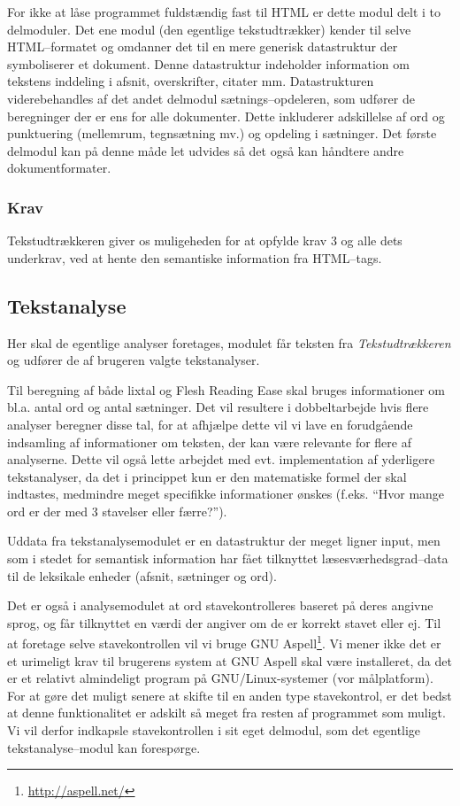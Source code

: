 \documentclass[a4paper,oneside]{memoir}
\begin{document}
For ikke at låse programmet fuldstændig fast til HTML er dette modul
delt i to delmoduler. Det ene modul (den egentlige tekstudtrækker)
kender til selve HTML--formatet og omdanner det til en mere generisk
datastruktur der symboliserer et dokument. Denne datastruktur
indeholder information om tekstens inddeling i afsnit, overskrifter,
citater mm. Datastrukturen viderebehandles af det andet delmodul
sætnings--opdeleren, som udfører de
beregninger der er ens for
alle dokumenter. Dette inkluderer adskillelse af ord og punktuering
(mellemrum, tegnsætning mv.) og opdeling i sætninger.  Det første
delmodul kan på denne måde let udvides så det også kan håndtere andre
dokumentformater.

\subsubsection{Krav}
Tekstudtrækkeren giver os muligeheden for at opfylde krav 3 og alle
dets underkrav, ved at hente den semantiske information fra
HTML--tags.

\subsection{Tekstanalyse}
\label{tekstanalysedesign}
Her skal de egentlige analyser foretages, modulet får teksten fra
\textit{Tekstudtrækkeren} og udfører de af brugeren valgte
tekstanalyser.

Til beregning af både lixtal og Flesh Reading Ease skal bruges
informationer om bl.a. antal ord og antal sætninger. Det vil resultere
i dobbeltarbejde hvis flere analyser beregner disse tal, for at
afhjælpe dette vil vi lave en forudgående indsamling af informationer
om teksten, der kan være relevante for flere af analyserne. Dette vil
også lette arbejdet med evt. implementation af yderligere
tekstanalyser, da det i princippet kun er den matematiske formel der
skal indtastes, medmindre meget specifikke informationer ønskes
(f.eks. ``Hvor mange ord er der med 3 stavelser eller færre?'').

Uddata fra tekstanalysemodulet er en datastruktur der meget ligner
input, men som i stedet for semantisk information har fået tilknyttet
læsesværhedsgrad--data til de leksikale enheder (afsnit, sætninger og
ord).

Det er også i analysemodulet at ord stavekontrolleres baseret på deres
angivne sprog, og får tilknyttet en værdi der angiver om de er korrekt
stavet eller ej. Til at foretage selve stavekontrollen vil vi bruge
GNU Aspell\footnote{\url{http://aspell.net/}}. Vi mener ikke det er et
urimeligt krav til brugerens system at GNU Aspell skal være
installeret, da det er et relativt almindeligt program på
GNU/Linux-systemer (vor målplatform). For at gøre det muligt senere at
skifte til en anden type stavekontrol, er det bedst at denne
funktionalitet er adskilt så meget fra resten af programmet som
muligt. Vi vil derfor indkapsle stavekontrollen i sit eget delmodul,
som det egentlige tekstanalyse--modul kan forespørge.
\end{document}
